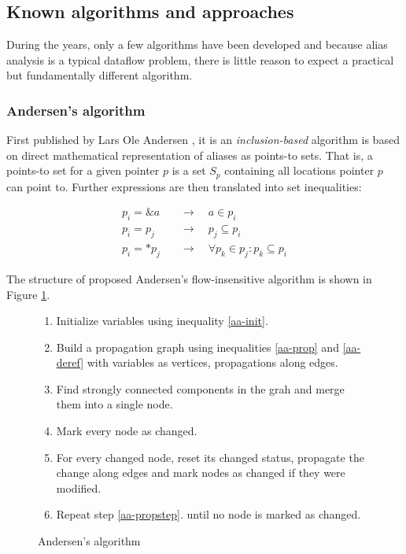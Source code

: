 \subsection{Known algorithms and approaches}

During the years, only a few algorithms have been developed and because alias
analysis is a typical dataflow problem, there is little reason to expect a
practical but fundamentally different algorithm.

\subsubsection{Andersen's algorithm}

First published by Lars Ole Andersen \cite{Andersen94}, it is an {\it
inclusion-based} algorithm is based on direct mathematical representation of
aliases as points-to sets. That is, a points-to set for a given pointer $p$ is a
set $S_p$ containing all locations pointer $p$ can point to.  Further
expressions are then translated into set inequalities:

\begin{align}
	\label{aa-init}
	p_i = \&a \quad &\to \quad a \in p_i \\
	\label{aa-prop}
	p_i = p_j \quad &\to \quad p_j \subseteq p_i \\
	\label{aa-deref}
	p_i = *p_j \quad &\to \quad \forall p_k \in p_j : p_k \subseteq p_i
\end{align}

The structure of proposed Andersen's flow-insensitive algorithm is shown in Figure
\ref{figure-andersen}.

\begin{figure}[!ht]
\begin{tcolorbox}
\begin{enumerate}
	\item Initialize variables using inequality \ref{aa-init}.
	\item Build a propagation graph using inequalities \ref{aa-prop} and \ref{aa-deref}
		with variables as vertices, propagations along edges.
	\item Find strongly connected components in the grah and merge them into a single node.
	\item Mark every node as changed.
	\item For every changed node, reset its changed status, propagate the change
		along edges and mark nodes as changed if they were modified.
	\label{aa-propstep} 
	\item Repeat step \ref{aa-propstep}. until no node is marked as changed.
\end{enumerate}
\end{tcolorbox}
\caption{Andersen's algorithm}
\label{figure-andersen}
\end{figure}

